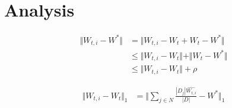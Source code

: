 \section{Analysis}

\newcommand{\wti}[0]{W_{t,i}}
\newcommand{\wt}[0]{W_{t}}
\newcommand{\norm}[1]{\Vert #1 \Vert_{1}}


\begin{equation}
\begin{split}
	\Vert \wti - W^*\Vert & = \Vert \wti -\wt + \wt - W^*\Vert \\
                      & \leq \Vert \wti -\wt \Vert + \Vert \wt - W^* \Vert \\
                      & \leq \Vert \wti -\wt \Vert + \rho	
\end{split}
\end{equation}

\begin{equation}
\begin{split}
	\norm{\wti -\wt}  & = \norm{\sum_{j\in N} \frac{|D_j|\hat{\wti}}{|D|} - W^*} 
\end{split}
\end{equation}
